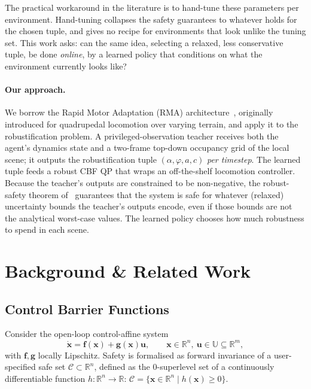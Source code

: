 \documentclass{article}
\newcommand{\R}{\mathbb{R}}
\newcommand{\bx}{\mathbf{x}}
\newcommand{\bu}{\mathbf{u}}
\newcommand{\bff}{\mathbf{f}}
\newcommand{\bg}{\mathbf{g}}
\begin{document}
The practical workaround in the literature is to hand-tune these parameters per
environment. Hand-tuning collapses the safety guarantees to whatever holds for
the chosen tuple, and gives no recipe for environments that look unlike the
tuning set. This work asks: can the same idea, selecting a relaxed, less
conservative tuple, be done \emph{online}, by a learned policy that
conditions on what the environment currently looks like?

\paragraph{Our approach.} We borrow the Rapid Motor Adaptation (RMA)
architecture~\citep{kumar2021rma}, originally introduced for quadrupedal locomotion
over varying terrain, and apply it to the robustification problem. A
privileged-observation teacher receives both the agent's dynamics state and a
two-frame top-down occupancy grid of the local scene; it outputs the
robustification tuple $(\alpha,\varphi,a,c)$ \emph{per timestep}. The learned
tuple feeds a robust CBF QP that wraps an off-the-shelf locomotion controller.
Because the teacher's outputs are constrained to be non-negative,
the robust-safety theorem of~\citep{cosner2022safety} guarantees that the system
is safe for whatever (relaxed) uncertainty bounds the teacher's outputs encode,
even if those bounds are not the analytical worst-case values. The learned
policy chooses how much robustness to spend in each scene.

\section{Background \& Related Work}
\label{sec:background}

\subsection{Control Barrier Functions}

Consider the open-loop control-affine system
\begin{equation}
\dot{\bx} = \bff(\bx) + \bg(\bx)\bu,
\qquad \bx \in \R^n,\ \bu \in \mathbb{U}\subseteq \R^m,
\label{eq:dyn}
\end{equation}
with $\bff,\bg$ locally Lipschitz. Safety is formalised as forward invariance
of a user-specified safe set $\mathcal{C}\subset\R^n$, defined as the
$0$-superlevel set of a continuously differentiable function
$h:\R^n\to\R$:
$\mathcal{C}=\{\bx\in\R^n\mid h(\bx)\geq 0\}$.
\end{document}
